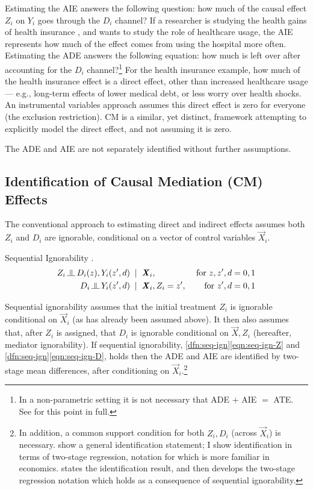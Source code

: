 Estimating the AIE answers the following question: how much of the causal effect $Z_i$ on $Y_i$ goes through the $D_i$ channel?
If a researcher is studying the health gains of health insurance \citep{finkelstein2008oregon}, and wants to study the role of healthcare usage, the AIE represents how much of the effect comes from using the hospital more often.
Estimating the ADE answers the following equation: how much is left over after accounting for the $D_i$ channel?\footnote{
    In a non-parametric setting it is not necessary that ADE $+$ AIE $=$ ATE.
    See \cite{imai2010identification} for this point in full.
}
For the health insurance example, how much of the health insurance effect is a direct effect, other than increased healthcare usage --- e.g., long-term effects of lower medical debt, or less worry over health shocks.
An instrumental variables approach assumes this direct effect is zero for everyone (the exclusion restriction).
CM is a similar, yet distinct, framework attempting to explicitly model the direct effect, and not assuming it is zero.

The ADE and AIE are not separately identified without further assumptions.

\subsection{Identification of Causal Mediation (CM) Effects}
The conventional approach to estimating direct and indirect effects assumes both $Z_i$ and $D_i$ are ignorable, conditional on a vector of control variables $\vec X_i$.
\begin{definition}
    \label{dfn:seq-ign}
    Sequential Ignorability \citep{imai2010identification}.
    \begin{align}
        \label{eqn:seq-ign-Z}
        Z_i \indep  D_i(z), Y_i(z', d) \;\; &| \;\; \vec X_i,
            &\textnormal{ for } z, z', d = 0, 1 \\
        \label{eqn:seq-ign-D}
        D_i \indep Y_i(z', d) \;\; &| \;\; \vec X_i, Z_i = z', 
            &\textnormal{ for } z', d = 0, 1
    \end{align}
\end{definition}
Sequential ignorability assumes that the initial treatment $Z_i$ is ignorable conditional on $\vec X_i$ (as has already been assumed above).
It then also assumes that, after $Z_i$ is assigned, that $D_i$ is ignorable conditional on $\vec X, Z_i$ (hereafter, mediator ignorability).
If sequential ignorability, \ref{dfn:seq-ign}\eqref{eqn:seq-ign-Z} and \ref{dfn:seq-ign}\eqref{eqn:seq-ign-D}, holds then the ADE and AIE are identified by two-stage mean differences, after conditioning on $\vec X_i$.\footnote{
    In addition, a common support condition for both $Z_i, D_i$ (across $\vec X_i$) is necessary.
    \cite{imai2010identification} show a general identification statement; I show identification in terms of two-stage regression, notation for which is more familiar in economics.
     states the \cite{imai2010identification} identification result, and then develops the two-stage regression notation which holds as a consequence of sequential ignorability.
}
\vspace{0.1cm}

